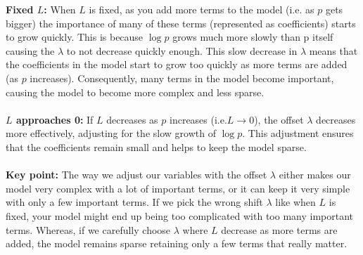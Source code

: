 \textbf{Fixed $L$:} When $L$ is fixed, as you add more terms to the model (i.e. as $p$ gets bigger) the importance of many of these terms (represented as coefficients) starts to grow quickly. This is because $\log p$ grows much more slowly than p itself causing the $\lambda$ to not decrease quickly enough. This slow decrease in $\lambda$ means that the coefficients in the model start to grow too quickly as more terms are added (as $p$ increases). Consequently, many terms in the model become important, causing the model to become more complex and less sparse.\\ 
\\
\textbf{$L$ approaches 0:} If $L$ decreases as $p$ increases (i.e.$L \rightarrow 0$), the offset $\lambda$ decreases more effectively, adjusting for the slow growth of $\log p$. This adjustment ensures that the coefficients remain small and helps to keep the model sparse. \\
\\
\textbf{Key point:} The way we adjust our variables with the offset $\lambda$ either makes our model very complex with a lot of important terms, or it can keep it very simple with only a few important terms. If we pick the wrong shift $\lambda$ like when $L$ is fixed, your model might end up being too complicated with too many important terms. Whereas, if we carefully choose $\lambda$ where $L$ decrease as more terms are added, the model remains sparse retaining only a few terms that really matter.

